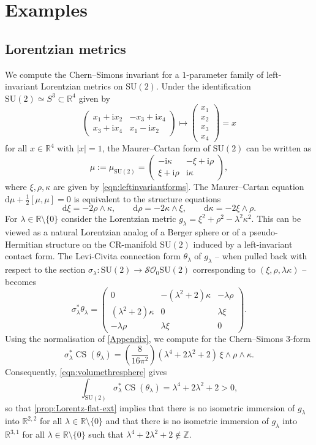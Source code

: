 \documentclass[british,11pt,a4paper]{amsart}
\numberwithin{equation}{section}
\newcommand{\CS}{\operatorname{CS}}
\newcommand{\Z}{\mathbb{Z}}
\renewcommand*{\d}{\mathrm{d}}
\newcommand*{\R}{\mathbb{R}}
\renewcommand{\i}{\mathrm{i}}
\numberwithin{theorem}{section}
\theoremstyle{definition}
\theoremstyle{remark}
\begin{document}
\section{Examples}\label{app:examples}

\subsection{Lorentzian metrics}

We compute the Chern--Simons invariant for a $1$-parameter family of left-invariant Lorentzian metrics on $\mathrm{SU}(2)$. Under the identification $\mathrm{SU}(2)\simeq S^3\subset \R^4$ given by
\[
\begin{pmatrix} x_1+\i x_2 & -x_3+\i x_4 \\ x_3+\i x_4 & x_1-\i x_2 \end{pmatrix} \mapsto \begin{pmatrix} x_1 \\ x_2 \\ x_3 \\ x_4 \end{pmatrix}=x
\]
for all $x \in \R^4$ with $|x|=1$, the Maurer--Cartan form of $\mathrm{SU}(2)$ can be written as
\[
\mu:=\mu_{\mathrm{SU}(2)}=\begin{pmatrix} -\i \kappa & -\xi+\i \rho \\ \xi+\i\rho & \i \kappa \end{pmatrix},
\]
where $\xi,\rho,\kappa$ are given by \eqref{eqn:leftinvariantforms}. The Maurer--Cartan equation $\d\mu+\tfrac{1}{2}[\mu,\mu]=0$ is equivalent to the structure equations
\[
\d\xi=-2\rho\wedge\kappa, \qquad \d\rho=-2\kappa\wedge\xi, \qquad \d\kappa=-2\xi\wedge\rho.
\]
For $\lambda \in \R\setminus\{0\}$ consider the Lorentzian metric
$g_{\lambda}=\xi^2+\rho^2-\lambda^2\kappa^2$. This can be viewed as a natural
Lorentzian analog of a Berger sphere or of a pseudo-Hermitian structure on the
CR-manifold $\mathrm{SU}(2)$ induced by a left-invariant contact form. The Levi-Civita
connection form $\theta_{\lambda}$ of $g_{\lambda}$ -- when pulled back with respect
to the section $\sigma_{\lambda} : \mathrm{SU}(2) \to \mathcal{SO}_0\mathrm{SU}(2)$
corresponding to $(\xi,\rho,\lambda\kappa)$ -- becomes
\[
\sigma^*_{\lambda}\theta_{\lambda}= \begin{pmatrix} 0 & -(\lambda^2+2)\kappa & -\lambda\rho \\ (\lambda^2+2)\kappa & 0 & \lambda\xi \\  -\lambda\rho & \lambda\xi & 0 \end{pmatrix}.
\]
Using the normalisation of \cref{Appendix}, we compute for the Chern--Simons $3$-form
\[
\sigma^*_{\lambda}\CS(\theta_{\lambda})=\left(\frac{8}{16\pi^2}\right)(\lambda^4+2\lambda^2+2)\,\xi\wedge\rho\wedge\kappa.
\]
Consequently, \eqref{eqn:volumethresphere} gives
\[
\int_{\mathrm{SU}(2)}\sigma^*_{\lambda}\CS(\theta_{\lambda})=\lambda^4+2\lambda^2+2>0,
\]
so that \cref{prop:Lorentz-flat-ext} implies that there is no isometric immersion of $g_{\lambda}$ into $\R^{2,2}$ for all $\lambda \in \R\setminus\{0\}$ and that there is no isometric immersion of $g_{\lambda}$ into $\R^{3,1}$ for all $\lambda \in \R\setminus\{0\}$ such that $\lambda^4+2\lambda^2+2 \notin \Z$.
\end{document}
